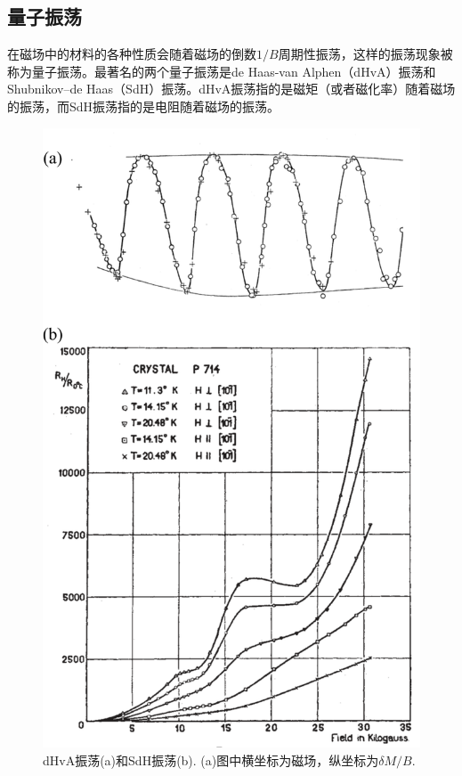 \subsection{量子振荡}

在磁场中的材料的各种性质会随着磁场的倒数$1/B$周期性振荡，这样的振荡现象被称为量子振荡。最著名的两个量子振荡是de Haas-van Alphen（dHvA）振荡和Shubnikov–de Haas（SdH）振荡。dHvA振荡指的是磁矩（或者磁化率）随着磁场的振荡，而SdH振荡指的是电阻随着磁场的振荡。

\begin{figure}
	\includegraphics[width=1.0\textwidth]{data/quantum-oscillation.png}
	\caption{dHvA振荡(a)和SdH振荡(b). (a)图中横坐标为磁场，纵坐标为$\delta M/B$.\label{quantum-oscillation}}
\end{figure}

